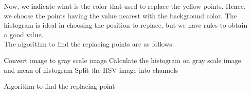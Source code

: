 Now, we indicate what is the color that used to replace the yellow points. Hence, we choose the points having the value nearest with the background color. The histogram is ideal in choosing the position to replace, but we have rules to obtain a good value.\\
The algorithm to find the replacing points are as follows:\\
\IncMargin{1em}
\begin{algorithm}[H]
\Indm 
{}
\Indp
Convert image to gray scale image\;
Calculate the histogram on gray scale image and mean of histogram\;
Split the HSV image into channels\;

\caption{Algorithm to find the replacing point}
\end{algorithm}\DecMargin{1em}
